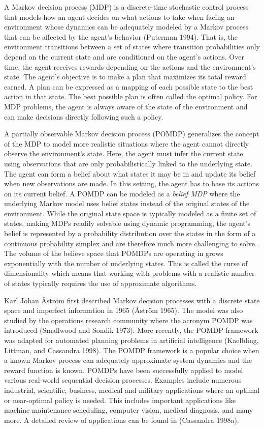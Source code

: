 A Markov decision process (MDP)
is a discrete-time stochastic control process that models
how an agent decides on what actions to take when facing an environment
whose dynamics can be adequately modeled by a Markov process that can be
affected by the agent's behavior (Puterman 1994).
That is, the environment transitions between a set of states
where transition probabilities only depend on the current state and
are conditioned on the agent's actions.
Over time, the agent receives rewards depending on the actions and the
environment's state. The agent's objective is to make a plan that
maximizes its total reward earned.
A plan can be expressed as a mapping of each possible state
to the best action in that state.
The best possible plan is often called the optimal policy.
For MDP problems, the agent is always aware of
the state of the environment and can make decisions directly following such a policy.

A partially observable Markov decision process (POMDP) generalizes the
concept of the MDP to model more realistic situations where the agent
cannot directly observe the environment's state.
Here, the agent must
infer the current state using observations that are only probabilistically linked to
the underlying state. The agent can form a belief about what states
it may be in and update its belief when new observations are made.
In this setting, the agent has to base its actions on its current belief.
A POMDP can be modeled as a \emph{belief MDP} where the underlying Markov model uses belief states instead of the original states of the environment.
While the original state space is typically modeled as a finite set of states, making MDPs readily solvable using dynamic programming, the agent's belief is represented by a probability distribution over the states in the form of a continuous probability simplex
and are therefore much more challenging to solve.
The volume of the believe space that POMDPs are operating in grows
exponentially with the number of underlying states.
This is called the curse of dimensionality which means that working with
problems with a
realistic number of states typically requires the use of approximate algorithms.

Karl Johan Åström first described Markov decision processes with
a discrete state space and imperfect information in 1965
(Åström 1965). The model was also studied by the operations research community where the acronym POMDP was introduced (Smallwood and Sondik 1973).
More recently, the POMDP framework was adapted for automated planning problems in artificial intelligence (Kaelbling, Littman, and Cassandra 1998).
The POMDP framework is a popular choice when a known Markov process can adequately approximate system
dynamics and the reward function is known. POMDPs have been successfully applied to
model various real-world sequential decision processes.
Examples include numerous industrial, scientific, business, medical and military applications where an optimal or near-optimal policy is needed. This includes important applications like machine maintenance scheduling, computer vision, medical diagnosis, and many more. A detailed review of applications can be found in (Cassandra 1998a).

